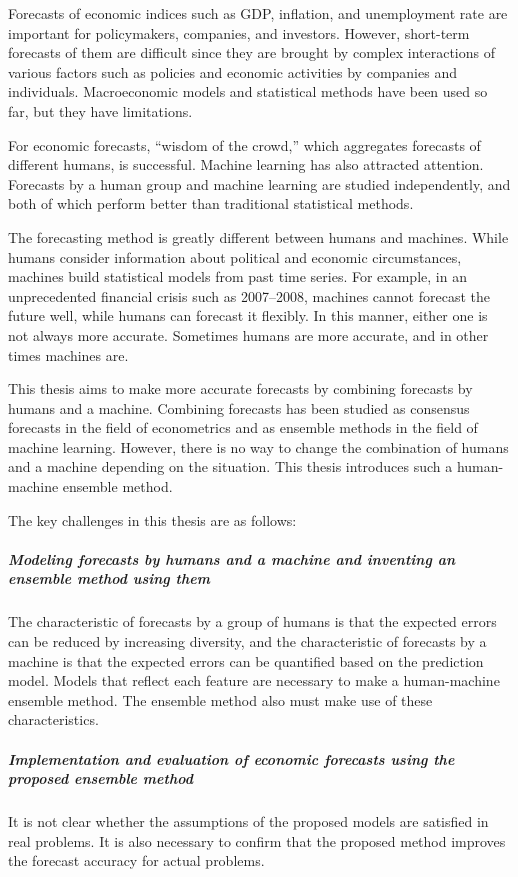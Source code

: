 \documentclass[../main.tex]{subfiles}
\begin{document}
\begin{eabstract}
Forecasts of economic indices such as GDP, inflation, and unemployment rate are important for policymakers, companies, and investors.
However, short-term forecasts of them are difficult since they are brought by complex interactions of various factors such as policies and economic activities by companies and individuals.
Macroeconomic models and statistical methods have been used so far, but they have limitations.

For economic forecasts, ``wisdom of the crowd,'' which aggregates forecasts of different humans, is successful.
Machine learning has also attracted attention.
Forecasts by a human group and machine learning are studied independently, and both of which perform better than traditional statistical methods.

The forecasting method is greatly different between humans and machines.
While humans consider information about political and economic circumstances, machines build statistical models from past time series.
For example, in an unprecedented financial crisis such as 2007--2008, machines cannot forecast the future well, while humans can forecast it flexibly.
In this manner, either one is not always more accurate.
Sometimes humans are more accurate, and in other times machines are.

This thesis aims to make more accurate forecasts by combining forecasts by humans and a machine.
Combining forecasts has been studied as consensus forecasts in the field of econometrics and as ensemble methods in the field of machine learning.
However, there is no way to change the combination of humans and a machine depending on the situation.
This thesis introduces such a human-machine ensemble method.

The key challenges in this thesis are as follows:

\subparagraph{Modeling forecasts by humans and a machine and inventing an ensemble method using them}
The characteristic of forecasts by a group of humans is that the expected errors can be reduced by increasing diversity, and the characteristic of forecasts by a machine is that the expected errors can be quantified based on the prediction model.
Models that reflect each feature are necessary to make a human-machine ensemble method.
The ensemble method also must make use of these characteristics.

\subparagraph{Implementation and evaluation of economic forecasts using the proposed ensemble method}
It is not clear whether the assumptions of the proposed models are satisfied in real problems.
It is also necessary to confirm that the proposed method improves the forecast accuracy for actual problems.


\end{eabstract}
\end{document}
